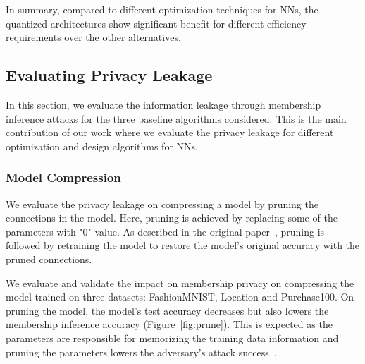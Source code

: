 In summary, compared to different optimization techniques for NNs, the quantized architectures show significant benefit for different efficiency requirements over the other alternatives.


\subsection{Evaluating Privacy Leakage}

In this section, we evaluate the information leakage through membership inference attacks for the three baseline algorithms considered.
This is the main contribution of our work where we evaluate the privacy leakage for different optimization and design algorithms for NNs.

\subsubsection{Model Compression}

We evaluate the privacy leakage on compressing a model by pruning the connections in the model.
Here, pruning is achieved by replacing some of the parameters with "0" value.
As described in the original paper~\cite{}, pruning is followed by retraining the model to restore the model's original accuracy with the pruned connections.

We evaluate and validate the impact on membership privacy on compressing the model trained on three datasets: FashionMNIST, Location and Purchase100.
On pruning the model, the model's test accuracy decreases but also lowers the membership inference accuracy (Figure~\ref{fig:prune}).
This is expected as the parameters are responsible for memorizing the training data information and pruning the parameters lowers the adversary's attack success~\cite{rezawhite}.

